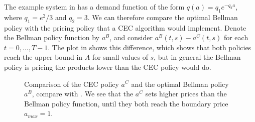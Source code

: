 \documentclass[main.tex]{subfiles}
\begin{document}
The example system in  has a demand
function of the form $q(a)=q_1e^{-q_2a}$, where $q_1=e^2/3$ and
$q_2=3$. We can therefore compare the optimal Bellman policy with the
pricing policy that a CEC algorithm would implement.
Denote the Bellman policy function by $a^B$, and consider
$a^B(t,s)-a^C(t,s)$ for each $t=0,\dots,T-1$. The plot in
 shows this difference, which
shows that both policies reach the upper bound in $A$ for small values
of $s$, but in general the Bellman policy is pricing the products
lower than the CEC policy would do.
\begin{figure}[htbp]
  \centering
  \caption{Comparison of the CEC policy $a^C$ and
    the optimal Bellman policy $a^B$, compare with
    .
    We see that the $a^C$ sets
    higher prices than the Bellman policy function, until they both reach the
    boundary price $a_{max}=1$.
  }\label{fig:bellman_det_policy_difference}
\end{figure}
\end{document}

